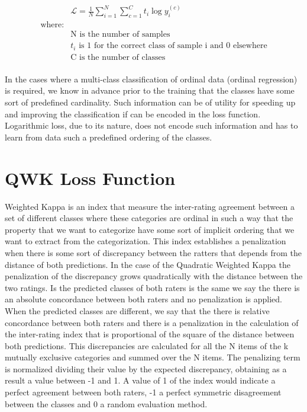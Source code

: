 \documentclass{IOS-Book-Article}
\begin{document}
\begin{equation*}
\begin{aligned}
\label{eq:log-loss}
&\mathcal{L} = \frac{1}{N} \sum_{i=1}^N \sum_{c=1}^C t_i \log{y_i^{(c)}} \\
\text{where:}\\
&\text{N is the number of samples}\\
&t_i \text{ is 1 for the correct class of sample i and 0 elsewhere}\\
&\text{C is the number of classes}\\
\end{aligned}
\end{equation*}


In the cases where a multi-class classification of ordinal data (ordinal regression) is required, we know in advance prior to the training that the classes have some sort of predefined cardinality. Such information can be of utility for speeding up and improving the classification if can be encoded in the loss function. Logarithmic loss, due to its nature, does not encode such information and has to learn from data such a predefined ordering of the classes.

\section{QWK Loss Function}

Weighted Kappa is an index that measure the inter-rating agreement between a set of different classes where these categories are ordinal in such a way that the property that we want to categorize have some sort of implicit ordering that we want to extract from the categorization. This index establishes a penalization when there is some sort of discrepancy between the ratters that depends from the distance of both predictions. In the case of the Quadratic Weighted Kappa the penalization of the discrepancy grows quadratically with the distance between the two ratings. Is the predicted classes of both raters is the same we say the there is an absolute concordance between both raters and no penalization is applied. When the predicted classes are different, we say that the there is relative concordance between both raters and there is a penalization in the calculation of the inter-rating index that is proportional of the square of the distance between both predictions. This discrepancies are calculated for all the N items of the k mutually exclusive categories and summed over the N items. The penalizing term is normalized dividing their value by the expected  discrepancy, obtaining as a result a value between -1 and 1. A value of 1 of the index would indicate a perfect agreement between both raters, -1 a perfect symmetric disagreement between the classes and 0 a random evaluation method. 
\end{document}
